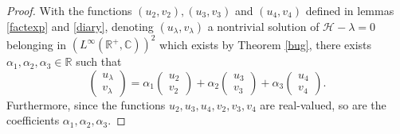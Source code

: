 \documentclass[11 pt]{amsart}
\theoremstyle{definition}
\theoremstyle{remark}
\numberwithin{equation}{section}
\begin{document}
\begin{proof}
  With the functions $(u_2, v_2), (u_3, v_3)$ and $(u_4, v_4)$ defined in
  lemmas \ref{factexp} and \ref{diary}, denoting $(u_{\lambda}, v_{\lambda})$ a nontrivial solution
  of $\mathcal{H}- \lambda = 0$ belonging in $(L^{\infty} (\mathbb{R}^+,
  \mathbb{C}))^2$ which exists by Theorem \ref{bug}, there exists
  $\alpha_1, \alpha_2, \alpha_3 \in \mathbb{R}$ such that
  \[ \left(\begin{array}{c}
       u_{\lambda}\\
       v_{\lambda}
     \end{array}\right) = \alpha_1 \left(\begin{array}{c}
       u_2\\
       v_2
     \end{array}\right) + \alpha_2 \left(\begin{array}{c}
       u_3\\
       v_3
     \end{array}\right) + \alpha_3 \left(\begin{array}{c}
       u_4\\
       v_4
     \end{array}\right) . \]
Furthermore, since the functions $u_2, u_3, u_4, v_2, v_3, v_4$ are real-valued, so are the coefficients $\alpha_1, \alpha_2, \alpha_3$.
  

\end{proof}
\end{document}
